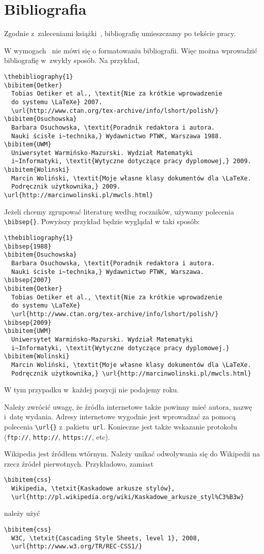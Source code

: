 \section{Bibliografia}
Zgodnie z~zaleceniami książki~\cite{Osuchowska}, bibliografię umieszczamy po tekście pracy. 

W wymogach~\cite{UWM} nie mówi się o formatowaniu bibliografii. Więc można wprowadzić bibliografię w~zwykły sposób. Na przykład,
\begin{verbatim}
\thebibliography{1}
\bibitem{Oetker}
  Tobias Oetiker et al., \textit{Nie za krótkie wprowadzenie
  do systemu \LaTeXe} 2007. 
  \url{http://www.ctan.org/tex-archive/info/lshort/polish/}
\bibitem{Osuchowska}
  Barbara Osuchowska, \textit{Poradnik redaktora i autora.
  Nauki ścisłe i~technika,} Wydawnictwo PTWK, Warszawa 1988.
\bibitem{UWM}
  Uniwersytet Warmińsko-Mazurski. Wydział Matematyki
  i~Informatyki, \textit{Wytyczne dotyczące pracy dyplomowej,} 2009. 
\bibitem{Wolinski}
  Marcin Woliński, \textit{Moje własne klasy dokumentów dla \LaTeXe.
  Podręcznik użytkownika,} 2009. \url{http://marcinwolinski.pl/mwcls.html}
\end{verbatim}

Jeżeli chcemy zgrupować literaturę według roczników, używamy polecenia \verb|\bibsep{}|. Powyższy przykład będzie wyglądał w taki sposób:
\begin{verbatim}
\thebibliography{1}
\bibsep{1988}
\bibitem{Osuchowska}
  Barbara Osuchowska, \textit{Poradnik redaktora i autora.
  Nauki ścisłe i~technika,} Wydawnictwo PTWK, Warszawa.
\bibsep{2007}
\bibitem{Oetker}
  Tobias Oetiker et al., \textit{Nie za krótkie wprowadzenie
  do systemu \LaTeXe}
  \url{http://www.ctan.org/tex-archive/info/lshort/polish/}
\bibsep{2009}
\bibitem{UWM}
  Uniwersytet Warmińsko-Mazurski. Wydział Matematyki
  i~Informatyki, \textit{Wytyczne dotyczące pracy dyplomowej.}
\bibitem{Wolinski}
  Marcin Woliński, \textit{Moje własne klasy dokumentów dla \LaTeXe.
  Podręcznik użytkownika,} \url{http://marcinwolinski.pl/mwcls.html}
\end{verbatim}
W tym przypadku w~każdej pozycji nie podajemy roku.


Należy zwrócić uwagę, że źródła internetowe także powinny mieć autora, nazwę i~datę wydania. Adresy internetowe wygodnie jest wprowadzać za pomocą polecenia \verb|\url{}| z~pakietu~\texttt{url}. Konieczne jest także wskazanie protokołu (\texttt{ftp://}, \texttt{http://}, \texttt{https://}, etc).

Wikipedia jest źródłem wtórnym. Należy unikać odwoływania się do Wikipedii na rzecz źródeł pierwotnych. Przykładowo, zamiast
\begin{verbatim}
\bibitem{css}
  Wikipedia, \tetxit{Kaskadowe arkusze stylów},
  \url{http://pl.wikipedia.org/wiki/Kaskadowe_arkusze_styl%C3%B3w}
\end{verbatim}
należy użyć
\begin{verbatim}
\bibitem{css}
  W3C, \tetxit{Cascading Style Sheets, level 1}, 2008,
  \url{http://www.w3.org/TR/REC-CSS1/}
\end{verbatim}

